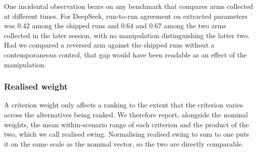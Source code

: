 One incidental observation bears on any benchmark that compares arms collected
at different times. For DeepSeek, run-to-run agreement on extracted parameters
was $0.42$ among the shipped runs and $0.64$ and $0.67$ among the two arms
collected in the later session, with no manipulation distinguishing the latter
two. Had we compared a
reversed arm against the shipped runs without a contemporaneous control, that
gap would have been readable as an effect of the manipulation.




\subsubsection{Realised weight}
\label{sec:realised-weight}

A criterion weight only affects a ranking to the extent that the criterion
varies across the alternatives being ranked. We therefore report, alongside the
nominal weights, the mean within-scenario range of each criterion and the
product of the two, which we call realised swing. Normalising realised swing to
sum to one puts it on the same scale as the nominal vector, so the two are
directly comparable.



